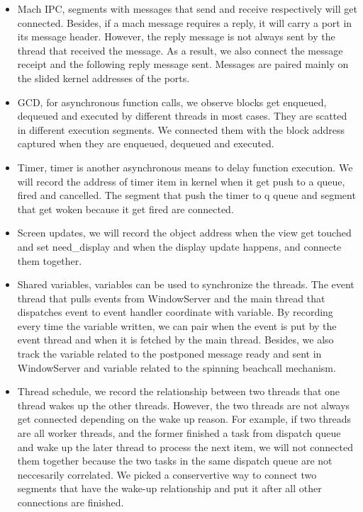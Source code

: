 \begin{itemize}
\item Mach IPC, segments with messages that send and receive respectively will get connected.
Besides, if a mach message requires a reply, it will carry a port in its message header.
However, the reply message is not always sent by the thread that received the message.
As a result, we also connect the message receipt and the following reply message sent.
Messages are paired mainly on the slided kernel addresses of the ports.
\item GCD, for asynchronous function calls, we observe blocks get enqueued, dequeued and executed by different threads in most cases.
They are scatted in different execution segments.
We connected them with the block address captured when they are enqueued, dequeued and executed.
\item Timer, timer is another asynchronous means to delay function execution.
We will record the address of timer item in kernel when it get push to a queue, fired and cancelled.
The segment that push the timer to q queue and segment that get woken because it get fired are connected.
\item Screen updates, we will record the object address when the view get touched and set need\_display and when the display update happens, and connecte them together.
\item Shared variables, variables can be used to synchronize the threads.
The event thread that pulls events from WindowServer and the main thread that dispatches event to event handler coordinate with variable.
By recording every time the variable written, we can pair when the event is put by the event thread and when it is fetched by the main thread.
Besides, we also track the variable related to the postponed message ready and sent in WindowServer and variable related to the spinning beachcall mechanism.
\item Thread schedule, we record the relationship between two threads that one thread wakes up the other threads.
However, the two threads are not always get connected depending on the wake up reason.
For example, if two threads are all worker threads, and the former finished a task from dispatch queue and wake up the later thread to process the next item, we will not connected them together because the two tasks in the same dispatch queue are not neccesarily correlated.
We picked a conservertive way to connect two segments that have the wake-up relationship and put it after all other connections are finished.
\end{itemize}

